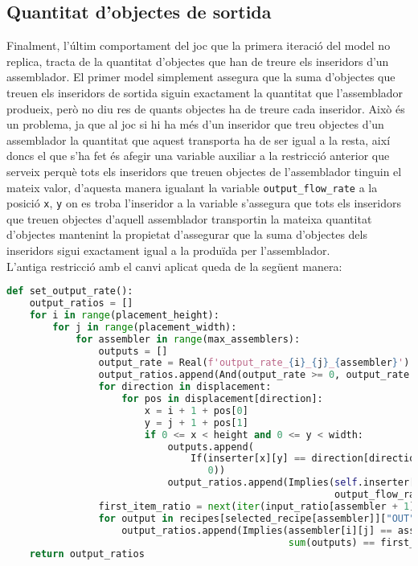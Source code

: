 \subsection{Quantitat d’objectes de sortida}
Finalment, l'últim comportament del joc que la primera iteració del model no replica, tracta de la quantitat d'objectes que han de treure els inseridors d'un assemblador. El primer model simplement assegura que la suma d'objectes que treuen els inseridors de sortida siguin exactament la quantitat que l'assemblador produeix, però no diu res de quants objectes ha de treure cada inseridor. Això és un problema, ja que al joc si hi ha més d'un inseridor que treu objectes d'un assemblador la quantitat que aquest transporta ha de ser igual a la resta, així doncs el que s'ha fet és afegir una variable auxiliar a la restricció anterior que serveix perquè tots els inseridors que treuen objectes de l'assemblador tinguin el mateix valor, d'aquesta manera igualant la variable \texttt{output\_flow\_rate} a la posició \texttt{x}, \texttt{y} on es troba l'inseridor a la variable s'assegura que tots els inseridors que treuen objectes d'aquell assemblador transportin la mateixa quantitat d'objectes mantenint la propietat d'assegurar que la suma d'objectes dels inseridors sigui exactament igual a la produïda per l'assemblador.\\

L'antiga restricció amb el canvi aplicat queda de la següent manera:

\begin{lstlisting}[language=Python, caption=Output Rate]
def set_output_rate():
    output_ratios = []
    for i in range(placement_height):
        for j in range(placement_width):
            for assembler in range(max_assemblers):
                outputs = []
                output_rate = Real(f'output_rate_{i}_{j}_{assembler}')
                output_ratios.append(And(output_rate >= 0, output_rate <= 50))
                for direction in displacement:
                    for pos in displacement[direction]:
                        x = i + 1 + pos[0]
                        y = j + 1 + pos[1]
                        if 0 <= x < height and 0 <= y < width:
                            outputs.append(
                                If(inserter[x][y] == direction[direction], output_flow_rate[x][y],
                                   0))
                            output_ratios.append(Implies(self.inserter[x][y] == direction[direction],
                                                         output_flow_rate[x][y] == output_rate))
                first_item_ratio = next(iter(input_ratio[assembler + 1].values()))
                for output in recipes[selected_recipe[assembler]]["OUT"]:
                    output_ratios.append(Implies(assembler[i][j] == assembler + 1,
                                                 sum(outputs) == first_item_ratio * output[1]))
    return output_ratios
\end{lstlisting}

